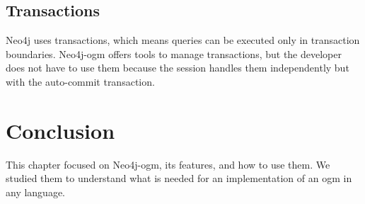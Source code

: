 \subsection{Transactions}

Neo4j uses transactions, which means queries can be executed only in transaction boundaries. Neo4j-\acrshort{ogm}
offers tools to manage transactions, but the developer does not have to use them because the session handles them independently but with the auto-commit transaction.

\section{Conclusion}

This chapter focused on Neo4j-\acrshort{ogm}, its features, and how to use them. We studied them to understand what is needed for
an implementation of an \acrshort{ogm} in any language.